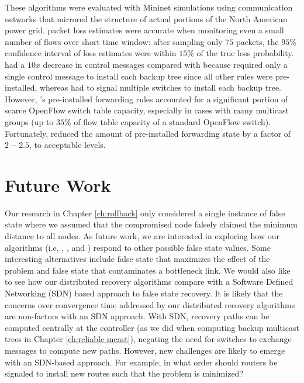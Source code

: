 These algorithms were evaluated with Mininet simulations using communication networks that mirrored the structure of actual portions of the North American power grid.
\pcnt packet loss estimates were accurate when monitoring even a small number of flows over short time window: after sampling only $75$ packets, the $95\%$ confidence interval of \pcnt loss estimates 
were within $15\%$ of the true loss probability. 
\pre had a $10x$ decrease in control messages compared with \post because \pre required only a single control message to install each backup tree since all other rules were pre-installed,
whereas \post had to signal multiple switches to install each backup tree. 
However, \pres's pre-installed forwarding rules accounted for a significant portion of scarce OpenFlow switch table capacity, especially in cases with many multicast groups (up to $35\%$ of
flow table capacity of a standard OpenFlow switch). Fortunately, \merge reduced the amount of pre-installed forwarding state by a factor of $2-2.5$, to acceptable levels.


\section{Future Work}
\label{sec:thesis-future}

Our research in Chapter \ref{ch:rollback} %
only considered a single instance of false state where we assumed that the compromised
node falsely claimed the minimum distance to all nodes.  As future work, we are interested in exploring how our algorithms (i.e, \seconds, \purges, and \cprs) 
respond to other possible false state values. Some interesting alternatives include false state that maximizes the effect of the \infinity problem and false state that contaminates a bottleneck link.
We would also like to see how our distributed recovery algorithms compare with a Software Defined Networking (SDN) based approach to false state recovery. 
It is likely that the concerns over convergence time addressed by our distributed recovery algorithms are non-factors with an SDN approach.  With SDN, recovery paths can be
computed centrally at the controller (as we did when computing backup multicast trees in Chapter \ref{ch:reliable-mcast}), negating the need for switches to exchange messages to compute
new paths. However, new challenges are likely to emerge with an SDN-based approach. For example, in what order should routers be signaled to install new routes such that 
the \infinity problem is minimized?



